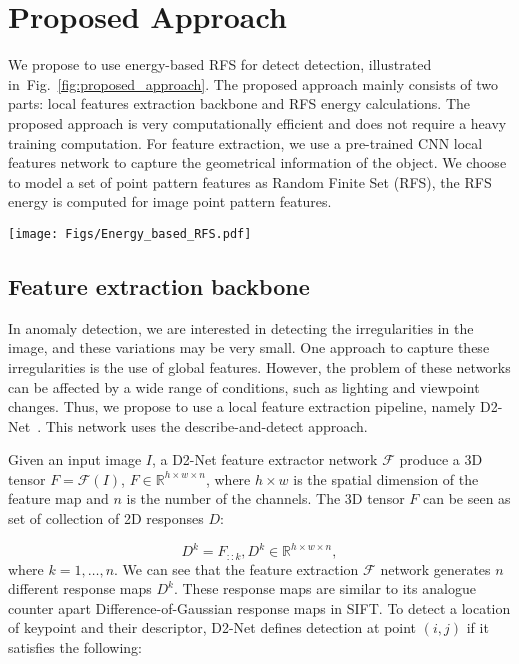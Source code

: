 \documentclass[journal]{IEEEtran}
\let\MYoriglatexcaption\caption
\renewcommand{\caption}[2][\relax]{\MYoriglatexcaption[#2]{#2}}
\begin{document}
\section{Proposed Approach}
\label{Sec:proposed_appraoch}
We propose to use energy-based RFS for detect detection, illustrated in~Fig.~\ref{fig:proposed_approach}. The proposed approach mainly consists of two parts: local features extraction backbone and RFS energy calculations. The proposed approach is very computationally efficient and does not require a heavy training computation. For feature extraction, we use a pre-trained CNN local features network to capture the geometrical information of the object. We choose to model a set of point pattern features as Random Finite Set (RFS), the RFS energy is computed for image point pattern features.
\begin{figure*}
	\texttt{[image: Figs/Energy\_based\_RFS.pdf]}
	\caption{Our proposed energy-based RFS of point pattern features for anomaly detection.}
	\label{fig:proposed_approach}
\end{figure*} 

\subsection{Feature extraction backbone}

In anomaly detection, we are interested in detecting the irregularities in the image, and these variations may be very small. One approach to capture these irregularities is the use of global features. However, the problem of these networks can be affected by a wide range of conditions, such as lighting and viewpoint changes. Thus, we propose to use a local feature extraction pipeline, namely D2-Net~\cite{dusmanu2019d2}. This network uses the describe-and-detect approach.

Given an input image $I$, a D2-Net feature extractor network $\mathcal{F}$ produce a 3D tensor $F=\mathcal{F}(I)$,  $F \in\mathbb{R}^{h\times w\times n}$, where $h\times w$ is the spatial dimension of the feature map and $n$ is the number of the channels. The 3D tensor $F$ can be seen as set of collection of 2D responses $D$:

\begin{equation}
D^k=F_{::k},D^k \in \mathbb{R}^{h\times w\times n},
\end{equation}
where $k=1,\ldots,n$. We can see that the feature extraction $\mathcal{F}$ network generates $n$ different response maps $D^k$. These response maps are similar to its analogue counter apart  Difference-of-Gaussian response maps in SIFT. To detect a location of keypoint and their descriptor, D2-Net defines detection at point $(i,j)$ if  it satisfies the following:
\end{document}
